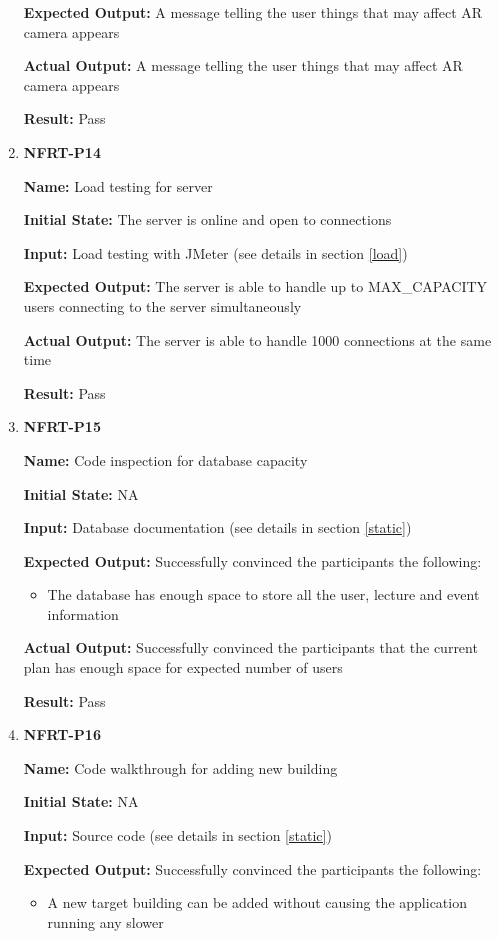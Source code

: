 \documentclass[12pt, titlepage]{article}
\begin{document}
\begin{enumerate}
\textbf{Expected Output:} A message telling the user things that may affect AR camera appears

\textbf{Actual Output:} A message telling the user things that may affect AR camera appears

\textbf{Result:} Pass

\item \textbf{NFRT-P14}

\textbf{Name:} Load testing for server

\textbf{Initial State:} The server is online and open to connections

\textbf{Input:} Load testing with JMeter (see details in section \ref{load})

\textbf{Expected Output:} The server is able to handle up to MAX\_CAPACITY users connecting to the server simultaneously

\textbf{Actual Output:} The server is able to handle 1000 connections at the same time

\textbf{Result:} Pass

\item \textbf{NFRT-P15}

\textbf{Name:} Code inspection for database capacity

\textbf{Initial State:} NA

\textbf{Input:} Database documentation (see details in section \ref{static})

\textbf{Expected Output:} Successfully convinced the participants the following:
\begin{itemize}
\item The database has enough space to store all the user, lecture and event information
\end{itemize}

\textbf{Actual Output:} Successfully convinced the participants that the current plan has enough space for expected number of users

\textbf{Result:} Pass

\item \textbf{NFRT-P16}

\textbf{Name:} Code walkthrough for adding new building

\textbf{Initial State:} NA

\textbf{Input:} Source code (see details in section \ref{static})

\textbf{Expected Output:} Successfully convinced the participants the following:
\begin{itemize}
\item A new target building can be added without causing the application running any slower
\end{itemize}


\end{enumerate}
\end{document}
